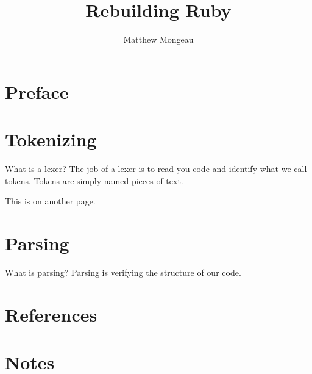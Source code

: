 \documentclass[oneside]{book}
\date{}
\begin{document}
\title{Rebuilding Ruby}
\author{Matthew Mongeau}
\maketitle

\frontmatter
\tableofcontents
\chapter*{Preface}

\mainmatter
\chapter{Tokenizing}
What is a lexer? The job of a lexer is to read you code and identify what we call tokens. Tokens are simply named pieces of text.

\newpage
This is on another page.

\chapter{Parsing}
What is parsing? Parsing is verifying the structure of our code.

\appendix
\chapter{References}

\backmatter
\chapter{Notes}
\end{document}
